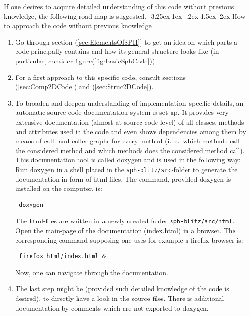 \documentclass{report}
\makeatletter
\renewcommand\paragraph{\@startsection{paragraph}{4}{\z@}%
  {-3.25ex\@plus -1ex \@minus -.2ex}%
  {1.5ex \@plus .2ex}%
  {\normalfont\normalsize\bfseries}}
\makeatother
\begin{document}
If one desires to acquire detailed understanding of this code without previous knowledge, the following road map is suggested.
\paragraph{How to approach the code without previous knowledge}
\begin{enumerate}
 \item Go through section (\ref{sec:ElementsOfSPH}) to get an idea on which parts a code principally contains and how its general structure looks like (in particular, consider figure(\ref{fig:BasicSphCode})).
\item For a first approach to this specific code, consult sections (\ref{sec:Comp2DCode}) and (\ref{sec:Struc2DCode}).
\item To broaden and deepen understanding of implementation--specific details,
an automatic source code documentation system is set up. It provides very extensive documentation (almost at source code level) of all classes, methods and attributes used in the code and even shows dependencies among them by means of call- and caller-graphs for every method (i.\ e.\ which methods call the considered method and which methods does the considered method call).
This documentation tool is called doxygen and is used in the following way:
Run doxygen in a shell placed in the {\tt sph-blitz/src}-folder to generate the documentation in form of html-files. The command, provided doxygen is installed on the computer, is:
\begin{verbatim} doxygen
\end{verbatim}
The html-files are written in a newly created folder {\tt sph-blitz/src/html}. Open the main-page of the documentation (index.html) in a browser. The corresponding command supposing one uses for example a firefox browser is:
\begin{verbatim} firefox html/index.html &
\end{verbatim}
Now, one can navigate through the documentation.
\item The last step might be (provided such detailed knowledge of the code is desired), to directly have a look in the source files. There is additional documentation by comments which are not exported to doxygen.
\end{enumerate}
\end{document}
